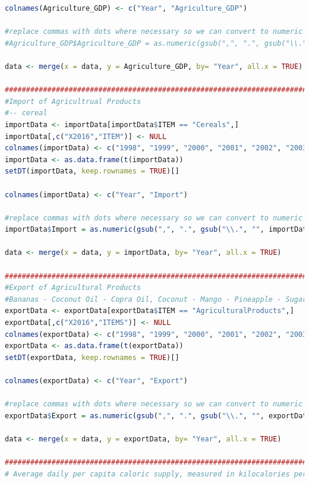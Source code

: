 \documentclass[11pt]{article}
\begin{document}
\begin{lstlisting}[language= R]
colnames(Agriculture_GDP) <- c("Year", "Agriculture_GDP")

#replace commas with dots where necessary so we can convert to numeric
#Agriculture_GDP$Agriculture_GDP = as.numeric(gsub(",", ".", gsub("\\.", "", Agriculture_GDP$Agriculture_GDP)))

data <- merge(x = data, y = Agriculture_GDP, by= "Year", all.x = TRUE)

####################################################################################################
#Import of Agricultrual Products 
#-- cereal 
importData <- importData[importData$ITEM == "Cereals",]
importData[,c("X2016","ITEM")] <- NULL
colnames(importData) <- c("1998", "1999", "2000", "2001", "2002", "2003", "2004", "2005", "2006", "2007", "2008", "2009", "2010", "2011", "2012", "2013", "2014", "2015")
importData <- as.data.frame(t(importData))
setDT(importData, keep.rownames = TRUE)[]

colnames(importData) <- c("Year", "Import")

#replace commas with dots where necessary so we can convert to numeric
importData$Import = as.numeric(gsub(",", ".", gsub("\\.", "", importData$Import)))

data <- merge(x = data, y = importData, by= "Year", all.x = TRUE)

####################################################################################################
#Export of Agricultural Products 
#Bananas - Coconut Oil - Copra Oil, Coconut - Mango - Pineapple - Sugar
exportData <- exportData[exportData$ITEM == "AgriculturalProducts",]
exportData[,c("X2016","ITEMS")] <- NULL
colnames(exportData) <- c("1998", "1999", "2000", "2001", "2002", "2003", "2004", "2005", "2006", "2007", "2008", "2009", "2010", "2011", "2012", "2013", "2014", "2015")
exportData <- as.data.frame(t(exportData))
setDT(exportData, keep.rownames = TRUE)[]

colnames(exportData) <- c("Year", "Export")

#replace commas with dots where necessary so we can convert to numeric
exportData$Export = as.numeric(gsub(",", ".", gsub("\\.", "", exportData$Export)))

data <- merge(x = data, y = exportData, by= "Year", all.x = TRUE)

####################################################################################################
# Average daily per capita caloric supply, measured in kilocalories per person per day. 


\end{lstlisting}
\end{document}
